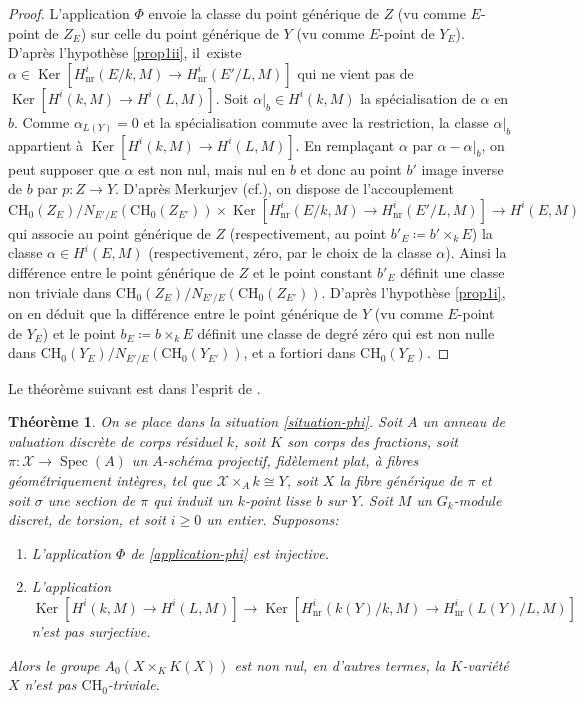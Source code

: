 \documentclass[11pt]{article}
\newcommand{\cf}{cf.\xspace}
\newenvironment{enumeratei}
{\bgroup\def\theenumi{\roman{enumi}}\def\theenumii{\arabic{enumii}}\begin{enumerate}}
{\end{enumerate}\egroup}
\newcommand{\CH}{\mathrm{CH}}
\newtheorem{thm}{Théorème}[section]
\theoremstyle{definition}
\newcommand{\Spec}{\operatorname{Spec}}
\newcommand{\Ker}{\operatorname{Ker}}
\newcommand{\mc}[1]{\mathcal{#1}}
\newcommand{\on}[1]{\operatorname{#1}}
\begin{document}
\begin{proof}
L'application $\Phi$ envoie la classe du point générique de
$Z$ (vu comme $E$-point de $Z_E$) sur celle du point générique de $Y$ (vu comme $E$-point de $Y_E$). D'après l'hypothèse \eqref{prop1ii}, il~existe $\alpha \in \Ker [H^i_{\on{nr}}(E/k,M) \to H^i_{\on{nr}}(E'/L,M)]$ qui ne vient pas de $\Ker[H^i(k,M) \to H^i(L,M)]$. Soit $\alpha|_b\in H^i(k,M)$ la spécialisation de $\alpha$ en $b$. Comme $\alpha_{L(Y)}=0$ et la spécialisation commute avec la restriction, la classe $\alpha|_b$ appartient à $\Ker[H^i(k,M) \to H^i(L,M)]$. En remplaçant $\alpha$ par $\alpha-\alpha|_b$, on peut supposer que $\alpha$ est non nul, mais nul en $b$ et donc au point $b'$ image inverse de $b$ par $p\colon Z \to Y$. D'après Merkurjev \cite[Cor.\,2.9]{merkurjev2008unramified} (\cf \cite[Cor.\,5.2]{schreieder2021unramified}), on dispose
de l'accouplement
\[\CH_{0}(Z_{E})/ N_{E'/E}(\CH_{0}(Z_{E'})) \times \Ker [H^i_{\on{nr}}(E/k,M) \to H^i_{\on{nr}}(E'/L,M)] \to H^i(E,M)\]
qui associe au point générique de $Z$ (respectivement, au point $b'_{E}\coloneqq b'\times_k E$) la classe $\alpha \in H^{i}(E,M)$ (respectivement, zéro, par le choix de la classe $\alpha$). Ainsi la différence entre le point générique de $Z$ et le point constant $b'_E$
définit une classe non triviale dans $\CH_{0}(Z_{E})/ N_{E'/E}(\CH_{0}(Z_{E'}))$. D'après l'hypothèse \eqref{prop1i}, on en déduit que
la différence entre le point générique de $Y$ (vu comme $E$-point de $Y_E$) et le point $b_{E}\coloneqq b\times_{k}E$
définit une classe de degré zéro qui est non nulle dans $\CH_{0}(Y_{E})/ N_{E'/E}(\CH_{0}(Y_{E'}))$,
et a fortiori dans $\CH_{0}(Y_{E})$.
\end{proof}

Le théorème suivant est dans l'esprit de \cite[Th.\,1.14]{colliot2016hypersurfaces}.

\begin{thm}\label{1.14K}
On se place dans la situation \ref{situation-phi}. Soit $A$ un anneau de valuation discrète de corps résiduel $k$, soit $K$ son corps des fractions, soit $\pi \colon { \mathcal{X}} \to \Spec(A)$ un $A$\nobreakdash-schéma projectif, fidèlement plat, à fibres géométriquement intègres, tel que \hbox{$\mc{X}\times_Ak\cong Y$}, soit $X$ la fibre générique de $\pi$ et soit $\sigma$ une section de $\pi$ qui induit un $k$-point lisse $b$ sur $Y$. Soit $M$ un $G_k$-module discret, de torsion, et soit $i\geq 0$ un entier. Supposons:
\begin{enumeratei}
\item\label{1.14Ki}
L'application $\Phi$ de \eqref{application-phi} est injective.
\item\label{1.14Kii}
L'application \[\Ker[H^i(k,M) \to H^i(L,M)] \to \Ker [H^i_{\on{nr}}(k(Y)/k,M) \to H^i_{\on{nr}}(L(Y)/L,M)]\] n'est pas
surjective.
\end{enumeratei}
Alors le groupe $A_{0}(X\times_{K}K(X))$ est non nul, en d'autres termes,
la $K$-variété $X$ n'est pas $\CH_{0}$-triviale.
\end{thm}
\end{document}

